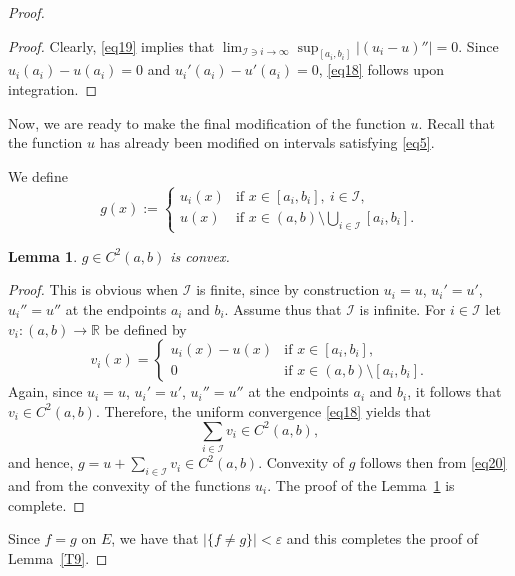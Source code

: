 \documentclass[intlimits,12pt,reqno]{amsart}
\newcommand{\bbbr}{\mathbb R}
\newcommand{\eps}{\varepsilon}
\newtheorem{lemma}[theorem]{Lemma}
\theoremstyle{definition}
\begin{document}
\begin{proof}
\begin{proof}
Clearly, \eqref{eq19} implies that $\lim_{\mathcal{I}\ni i\to\infty} \sup_{[a_i,b_i]}|(u_i-u)''|=0$. Since $u_i(a_i)-u(a_i)=0$ and $u_i'(a_i)-u'(a_i)=0$, \eqref{eq18} follows upon integration.
\end{proof}
Now, we are ready to make the final modification of the function $u$.
Recall that the function $u$ has already been modified on intervals satisfying \eqref{eq5}.

We define
$$
g(x):=
\begin{cases}
u_i(x) & \text{if } x\in [a_i,b_i],\ i\in \mathcal{I},\\
u(x)   & \text{if } x\in (a,b)\setminus\bigcup_{i\in\mathcal{I}} [a_i,b_i].
\end{cases}
$$
\begin{lemma}
\label{T8}
$g\in C^2(a,b)$ is convex.
\end{lemma}
\begin{proof}
This is obvious when $\mathcal{I}$ is finite, since by construction $u_i=u$, $u_i'=u'$, $u_i''=u''$ at the endpoints $a_i$ and $b_i$. Assume thus that $\mathcal{I}$ is infinite.
For $i\in \mathcal{I}$ let $v_i:(a,b)\to\bbbr$ be defined by
$$
v_i(x)=
\begin{cases}
u_i(x)-u(x) & \text{if } x\in [a_i,b_i],\\
0           & \text{if } x\in (a,b)\setminus [a_i,b_i].
\end{cases}
$$
Again, since $u_i=u$, $u_i'=u'$, $u_i''=u''$ at the endpoints $a_i$ and $b_i$, it follows that $v_i\in C^2(a,b)$. Therefore, the uniform convergence \eqref{eq18} yields that
$$
\sum_{i\in \mathcal{I}} v_i\in C^2(a,b),
$$
and hence, $g=u+\sum_{i\in\mathcal{I}}v_i\in C^2(a,b)$. Convexity of $g$ follows then from \eqref{eq20} and from the convexity of the functions $u_i$. The proof of the Lemma~\ref{T8} is complete.
\end{proof}
Since $f=g$ on $E$, we have that $|\{f\neq g\}|<\eps$ and this completes the proof of Lemma~\ref{T9}.
\end{proof}
\end{document}
